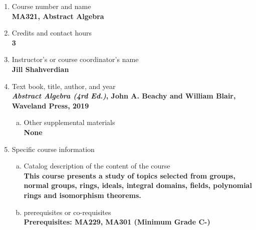 \label{MA321}  %
\begin{enumerate}[1.]
\item Course number and name\\
  {\bfseries
    MA321, Abstract Algebra
  }
  
\item Credits and contact hours\\
  {\bfseries
    3  %
  }

\item Instructor's or course coordinator's name\\
  {\bfseries
    Jill Shahverdian
  }

\item Text book, title, author, and year\\
  {\bfseries
    {\em Abstract Algebra (4rd Ed.)}, John A. Beachy and William Blair, Waveland Press, 2019
  }
\begin{enumerate}[a.]
\item Other supplemental materials\\
  {\bfseries
    None    
  }
\end{enumerate}

\item Specific course information
\begin{enumerate}[a.]  
\item Catalog description of the content of the course\\
  {\bfseries
This course presents a study of topics selected from groups, normal groups, rings, ideals, integral domains, fields, polynomial rings and isomorphism theorems.    
  }

\item prerequisites or co-requisites\\
  {\bfseries
    Prerequisites: MA229, MA301 (Minimum Grade C-) \\  %
  }


\end{enumerate}
\end{enumerate}
